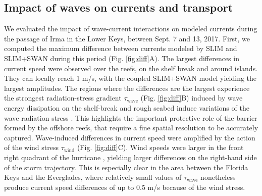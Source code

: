 \documentclass[preprint,12pt,authoryear]{elsarticle}
\begin{document}
\subsection{Impact of waves on currents and transport}

We evaluated the impact of wave-current interactions on modeled currents during the passage of Irma in the Lower Keys, between Sept. 7 and 13, 2017. First, we computed the maximum difference between currents modeled by SLIM and SLIM+SWAN during this period (Fig. \ref{fig:diff}A). The largest differences in current speed were observed over the reefs, on the shelf break and around islands. They can locally reach 1 m/s, with the coupled SLIM+SWAN model yielding the largest amplitudes. The regions where the differences are the largest experience the strongest radiation-stress gradient {\boldmath$\tau$}$_\text{wave}$ (Fig. \ref{fig:diff}B) induced by wave energy dissipation on the shelf-break and rough seabed induce variations of the wave radiation stress \citep{longuet1964radiation}. This highlights the important protective role of the barrier formed by the offshore reefs, that require a fine spatial resolution to be accurately captured. Wave-induced differences in current speed were amplified by the action of the wind stress {\boldmath$\tau$}$_\text{wind}$ (Fig. \ref{fig:diff}C). Wind speeds were larger in the front right quadrant of the hurricane \citep{zedler2009ocean}, yielding larger differences on the right-hand side of the storm trajectory. This is especially clear in the area between the Florida Keys and the Everglades, where relatively small values of {\boldmath$\tau$}$_\text{wave}$ nonetheless produce current speed differences of up to 0.5 m/s because of the wind stress.
\end{document}
